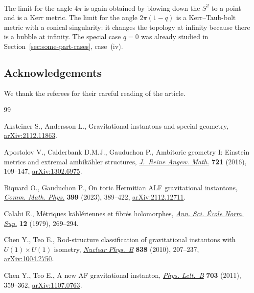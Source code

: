 \documentclass[pdftex]{sigma}
\numberwithin{equation}{section}
\begin{document}
\begin{pc}
\begin{align*}
 \end{align*}
 The limit for the angle $4\pi$ is again obtained by blowing down the $S^2$ to a point and is a Kerr metric. The limit for the angle $2\pi(1-q)$ is a Kerr--Taub-bolt metric with a conical singularity: it changes the topology at infinity because there is a bubble at infinity. The special case $q=0$ was already studied in Section~\ref{sec:some-part-cases}, case~(iv).
\end{pc}

\subsection*{Acknowledgements}
We thank the referees for their careful reading of the article.

\begin{thebibliography}{99}
\footnotesize\itemsep=0pt

Aksteiner S., Andersson L., Gravitational instantons and special geometry,
 \href{https://arxiv.org/abs/2112.11863}{arXiv:2112.11863}.

Apostolov V., Calderbank D.M.J., Gauduchon P., Ambitoric geometry {I}:
 {E}instein metrics and extremal ambik\"ahler structures, \href{https://doi.org/10.1515/crelle-2014-0060}{\textit{J.~Reine
 Angew. Math.}} \textbf{721} (2016), 109--147, \href{https://arxiv.org/abs/1302.6975}{arXiv:1302.6975}.

Biquard O., Gauduchon P., On toric {H}ermitian {ALF} gravitational instantons,
 \href{https://doi.org/10.1007/s00220-022-04562-z}{\textit{Comm. Math. Phys.}} \textbf{399} (2023), 389--422,
 \href{https://arxiv.org/abs/2112.12711}{arXiv:2112.12711}.

Calabi E., M\'etriques k\"ahl\'eriennes et fibr\'es holomorphes, \href{https://doi.org/10.24033/asens.1367}{\textit{Ann.
 Sci. \'Ecole Norm. Sup.}} \textbf{12} (1979), 269--294.

Chen Y., Teo E., Rod-structure classification of gravitational instantons with
 {$U(1)\times U(1)$} isometry, \href{https://doi.org/10.1016/j.nuclphysb.2010.05.017}{\textit{Nuclear Phys.~B}} \textbf{838} (2010),
 207--237, \href{https://arxiv.org/abs/1004.2750}{arXiv:1004.2750}.

Chen Y., Teo E., A new {AF} gravitational instanton, \href{https://doi.org/10.1016/j.physletb.2011.07.076}{\textit{Phys. Lett.~B}}
 \textbf{703} (2011), 359--362, \href{https://arxiv.org/abs/1107.0763}{arXiv:1107.0763}.


\end{thebibliography}
\end{document}
